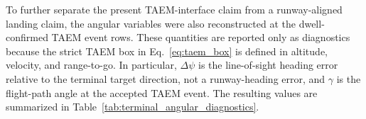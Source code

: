 To further separate the present TAEM-interface claim from a runway-aligned landing claim, the angular variables were also reconstructed at the dwell-confirmed TAEM event rows. These quantities are reported only as diagnostics because the strict TAEM box in Eq.~\eqref{eq:taem_box} is defined in altitude, velocity, and range-to-go. In particular, \(\Delta\psi\) is the line-of-sight heading error relative to the terminal target direction, not a runway-heading error, and \(\gamma\) is the flight-path angle at the accepted TAEM event. The resulting values are summarized in Table~\ref{tab:terminal_angular_diagnostics}.

\begin{table}[!htbp]
\centering
\scriptsize
\caption{Diagnostic angular quantities at dwell-confirmed TAEM closure. These quantities are reconstructed at the accepted TAEM event row and are not used as strict-pass variables in the present TAEM-interface claim.}
\label{tab:terminal_angular_diagnostics}
\end{table}
